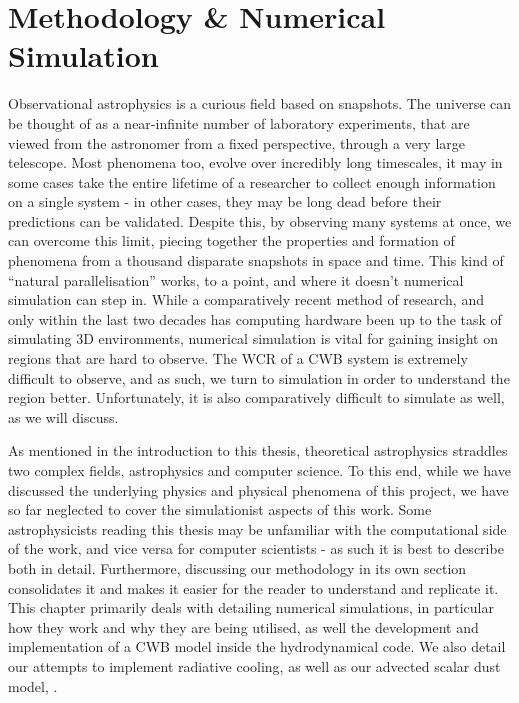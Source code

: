 \chapter{Methodology \& Numerical Simulation}
\label{ch:numsim}

Observational astrophysics is a curious field based on snapshots.
The universe can be thought of as a near-infinite number of laboratory experiments, that are viewed from the astronomer from a fixed perspective, through a very large telescope.
Most phenomena too, evolve over incredibly long timescales, it may in some cases take the entire lifetime of a researcher to collect enough information on a single system - in other cases, they may be long dead before their predictions can be validated.
Despite this, by observing many systems at once, we can overcome this limit, piecing together the properties and formation of phenomena from a thousand disparate snapshots in space and time.
This kind of ``natural parallelisation'' works, to a point, and where it doesn't numerical simulation can step in.
While a comparatively recent method of research, and only within the last two decades has computing hardware been up to the task of simulating 3D environments, numerical simulation is vital for gaining insight on regions that are hard to observe.
The WCR of a CWB system is extremely difficult to observe, and as such, we turn to simulation in order to understand the region better.
Unfortunately, it is also comparatively difficult to simulate as well, as we will discuss.

As mentioned in the introduction to this thesis, theoretical astrophysics straddles two complex fields, astrophysics and computer science.
To this end, while we have discussed the underlying physics and physical phenomena of this project, we have so far neglected to cover the simulationist aspects of this work.
Some astrophysicists reading this thesis may be unfamiliar with the computational side of the work, and vice versa for computer scientists - as such it is best to describe both in detail.
Furthermore, discussing our methodology in its own section consolidates it and makes it easier for the reader to understand and replicate it.
This chapter primarily deals with detailing numerical simulations, in particular how they work and why they are being utilised, as well the development and implementation of a CWB model inside the \athena{} hydrodynamical code.
We also detail our attempts to implement radiative cooling, as well as our advected scalar dust model, \bidmas.

